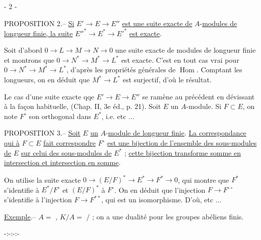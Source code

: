 
\begin{center}- 2 -\end{center}

PROPOSITION 2.-- \uline{Si} $E'\longrightarrow E\longrightarrow E''$ \uline{est une suite exacte de} $A$-\uline{modules de longueur finie, la suite} $E''^*\longrightarrow E^*\longrightarrow E'^*$ \uline{est exacte}.

Soit d'abord $0\longrightarrow L\longrightarrow M\longrightarrow N\longrightarrow0$ une suite exacte de modules de longueur finie et montrons que $0\longrightarrow N^*\longrightarrow M^*\longrightarrow L^*$ est exacte. C'est en tout cas vrai pour $0\longrightarrow N^*\longrightarrow M^*\longrightarrow L^*$, d'après les propriétés générales de $\operatorname{Hom}$. Comptant les longueurs, on en déduit que $M^*\longrightarrow L^*$ est surjectif, d'où le résultat.

Le cas d'une suite exacte qqe $E'\longrightarrow E\longrightarrow E''$ se ramène au précédent en dévissant à la façon habituelle, (Chap. II, 3e éd., p. 21). Soit $E$ un $A$-module. Si $F\subset E$, on note $F^{\circ}$ son orthogonal dans $E^*$, i.e. etc $\ldots$

PROPOSITION 3.-- \uline{Soit} $E$ \uline{un} $A$-\uline{module de longueur finie}. \uline{La correspondance qui à} $F\subset E$ \uline{fait correspondre} $F^{\circ}$ \uline{est une bijection de l'ensemble des sous-modules de} $E$ \uline{sur celui des sous-modules de} $E^*$ ; \uline{cette bijection transforme somme en intersection et intersection en somme}.

On utilise la suite exacte $0\longrightarrow(E/F)^*\longrightarrow E^*\longrightarrow F^*\longrightarrow0$, qui montre que $F^*$ s'identifie à $E^*/F^{\circ}$ et $(E/F)^*$ à $F^{\circ}$. On en déduit que l'injection $F\longrightarrow F^{\circ\circ}$ s'identifie à l'injection $F\longrightarrow F^{**}$, qui est un isomorphisme. D'où, etc $\ldots$

\uline{Exemple}.-- $A=$ , $K/A=$ $/$ ; on a une dualité pour les groupes abéliens finis.

\begin{center}-:-:-:-\end{center}

